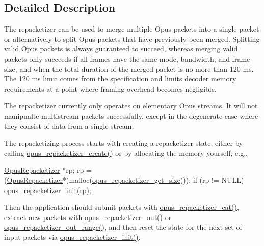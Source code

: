 \subsection{Detailed Description}
The repacketizer can be used to merge multiple Opus packets into a single packet or alternatively to split Opus packets that have previously been merged. Splitting valid Opus packets is always guaranteed to succeed, whereas merging valid packets only succeeds if all frames have the same mode, bandwidth, and frame size, and when the total duration of the merged packet is no more than 120 ms. The 120 ms limit comes from the specification and limits decoder memory requirements at a point where framing overhead becomes negligible.

The repacketizer currently only operates on elementary Opus streams. It will not manipualte multistream packets successfully, except in the degenerate case where they consist of data from a single stream.

The repacketizing process starts with creating a repacketizer state, either by calling \hyperlink{group__opus__repacketizer_gaa70e9708619188f673b5dc3f494c46ea}{opus\+\_\+repacketizer\+\_\+create()} or by allocating the memory yourself, e.\+g., 
\begin{DoxyCode}
\hyperlink{group__opus__repacketizer_ga1f85070a64bcbf5bf24f5ccb80323e7b}{OpusRepacketizer} *rp;
rp = (\hyperlink{group__opus__repacketizer_ga1f85070a64bcbf5bf24f5ccb80323e7b}{OpusRepacketizer}*)malloc(\hyperlink{group__opus__repacketizer_ga833b745bf92317e9ac26797a56eba6fd}{opus\_repacketizer\_get\_size}());
\textcolor{keywordflow}{if} (rp != NULL)
    \hyperlink{group__opus__repacketizer_gadef533688e80dcc96a32b955657aaf28}{opus\_repacketizer\_init}(rp);
\end{DoxyCode}


Then the application should submit packets with \hyperlink{group__opus__repacketizer_gaa739f0bbc0ad09ad159ffb6455a6bb55}{opus\+\_\+repacketizer\+\_\+cat()}, extract new packets with \hyperlink{group__opus__repacketizer_gaa1b5f68279829dcbaf31d374b2f3eac4}{opus\+\_\+repacketizer\+\_\+out()} or \hyperlink{group__opus__repacketizer_gad06762a8f4032823f6b64b63e8416efc}{opus\+\_\+repacketizer\+\_\+out\+\_\+range()}, and then reset the state for the next set of input packets via \hyperlink{group__opus__repacketizer_gadef533688e80dcc96a32b955657aaf28}{opus\+\_\+repacketizer\+\_\+init()}.

